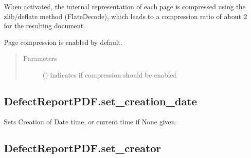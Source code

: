 \documentclass[letterpaper,10pt,english]{sphinxmanual}
\begin{document}
\begin{fulllineitems}
\begin{fulllineitems}
\sphinxAtStartPar
When activated, the internal representation of each page is compressed
using the zlib/deflate method (FlateDecode), which leads to a compression ratio
of about 2 for the resulting document.

\sphinxAtStartPar
Page compression is enabled by default.
\begin{quote}\begin{description}
\item[{Parameters}] \leavevmode
\sphinxAtStartPar
{} () \textendash{} indicates if compression should be enabled

\end{description}\end{quote}

\end{fulllineitems}



\subsection{DefectReportPDF.set\_creation\_date}
\label{\detokenize{generated/quality_assessment.quality_pdf_report.DefectReportPDF.set_creation_date:defectreportpdf-set-creation-date}}\label{\detokenize{generated/quality_assessment.quality_pdf_report.DefectReportPDF.set_creation_date::doc}}

\begin{fulllineitems}
\label{\detokenize{generated/quality_assessment.quality_pdf_report.DefectReportPDF.set_creation_date:quality_assessment.quality_pdf_report.DefectReportPDF.set_creation_date}}
\sphinxAtStartPar
Sets Creation of Date time, or current time if None given.

\end{fulllineitems}



\subsection{DefectReportPDF.set\_creator}
\label{\detokenize{generated/quality_assessment.quality_pdf_report.DefectReportPDF.set_creator:defectreportpdf-set-creator}}\label{\detokenize{generated/quality_assessment.quality_pdf_report.DefectReportPDF.set_creator::doc}}


\end{fulllineitems}
\end{document}
